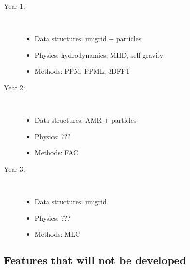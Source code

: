 \documentclass[11pt]{article}
\begin{document}

\begin{description}
\item[Year 1: ]\
\begin{itemize}
\item Data structures: unigrid + particles
\item Physics: hydrodynamics, MHD, self-gravity
\item Methods: PPM, PPML, 3DFFT
\end{itemize}

\item[Year 2: ]\
\begin{itemize}
\item Data structures: AMR + particles
\item Physics: ???
\item Methods: FAC
\end{itemize}

\item[Year 3: ]\
\begin{itemize}
\item Data structures: unigrid
\item Physics: ???
\item Methods: MLC
\end{itemize}
\end{description}
\subsection{Features that will not be developed}


\end{document}
